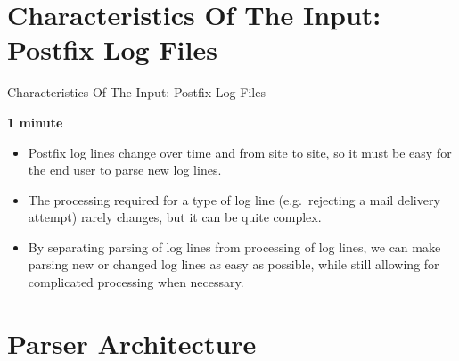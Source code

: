 \documentclass{beamer}
\newcommand{\timingnote}[1]{%
    \textbf{#1}%
}
\begin{document}
\section{Characteristics Of The Input: Postfix Log Files}

\begin{frame}{Characteristics Of The Input: Postfix Log Files}

    \timingnote{1 minute}

    \begin{itemize}

        \item Postfix log lines change over time and from site to site, so
            it must be easy for the end user to parse new log lines.

        \item The processing required for a type of log line (e.g.\
            rejecting a mail delivery attempt) rarely changes, but it can
            be quite complex.

        \item By separating parsing of log lines from processing of log
            lines, we can make parsing new or changed log lines as easy as
            possible, while still allowing for complicated processing when
            necessary.

    \end{itemize}

\end{frame}


\section{Parser Architecture}
\end{document}
